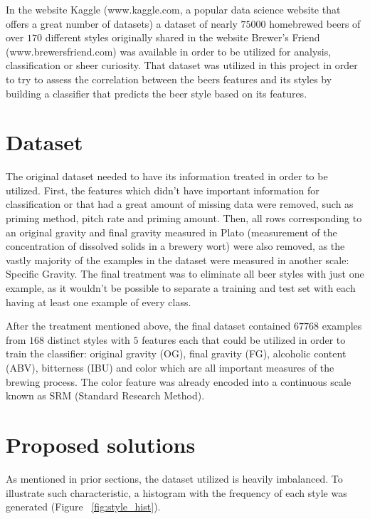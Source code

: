 \documentclass[10pt,twocolumn,letterpaper]{article}
\begin{document}
In the website Kaggle (www.kaggle.com, a popular data science website that offers a great number of datasets) a dataset of nearly $75000$ homebrewed beers of over $170$ different styles originally shared in the website Brewer's Friend (www.brewersfriend.com) was available in order to be utilized for analysis, classification or sheer curiosity. That dataset was utilized in this project in order to try to assess the correlation between the beers features and its styles by building a classifier that predicts the beer style based on its features.

\section{Dataset}

The original dataset needed to have its information treated in order to be utilized. First, the features which didn't have important information for classification or that had a great amount of missing data were removed, such as priming method, pitch rate and priming amount. Then, all rows corresponding to an original gravity and final gravity measured in Plato (measurement of the concentration of dissolved solids in a brewery wort) were also removed, as the vastly majority of the examples in the dataset were measured in another scale: Specific Gravity. The final treatment was to eliminate all beer styles with just one example, as it wouldn't be possible to separate a training and test set with each having at least one example of every class.

After the treatment mentioned above, the final dataset contained $67768$ examples from $168$ distinct styles with $5$ features each that could be utilized in order to train the classifier: original gravity (OG), final gravity (FG), alcoholic content (ABV), bitterness (IBU) and color which are all important measures of the brewing process. The color feature was already encoded into a continuous scale known as SRM (Standard Research Method).
 

\section{Proposed solutions}
As mentioned in prior sections, the dataset utilized is heavily imbalanced. To illustrate such characteristic, a histogram with the frequency of each style was generated (Figure ~\ref{fig:style_hist}).
\end{document}
